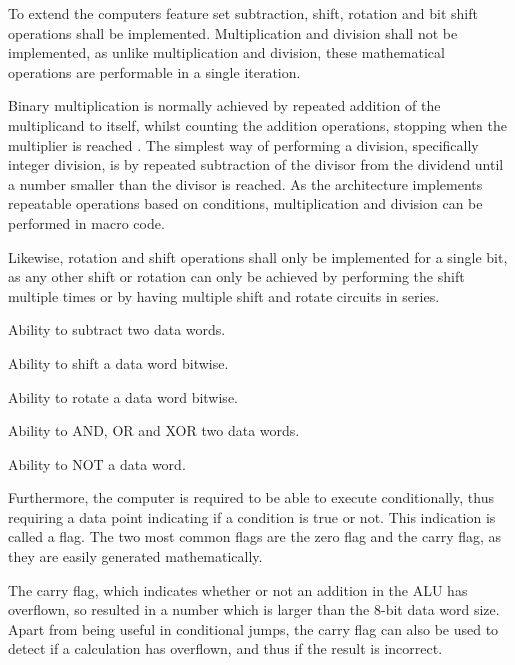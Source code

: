 To extend the computers feature set subtraction, shift, rotation and bit shift operations shall be implemented. Multiplication and division shall not be implemented, as unlike multiplication and division, these mathematical operations are performable in a single iteration. 

Binary multiplication is normally achieved by repeated addition of the multiplicand to itself, whilst counting the addition operations, stopping when the multiplier is reached \cite{cit.needed}. The simplest way of performing a division, specifically integer division, is by repeated subtraction of the divisor from the dividend until a number smaller than the divisor is reached.
As the architecture implements repeatable operations based on conditions, multiplication and division can be performed in macro code. 

Likewise, rotation and shift operations shall only be implemented for a single bit, as any other shift or rotation can only be achieved by performing the shift multiple times or by having multiple shift and rotate circuits in series. 

\begin{feat-requirement}
  Ability to subtract two data words.
\end{feat-requirement}

\begin{feat-requirement}
  Ability to shift a data word bitwise.
\end{feat-requirement}

\begin{feat-requirement}
  Ability to rotate a data word bitwise.
\end{feat-requirement}

\begin{feat-requirement}
  Ability to AND, OR and XOR two data words.
\end{feat-requirement}

\begin{feat-requirement}
  Ability to NOT a data word.
\end{feat-requirement}

Furthermore, the computer is required to be able to execute conditionally, thus requiring a data point indicating if a condition is true or not. This indication is called a flag. The two most common flags are the zero flag and the carry flag, as they are easily generated mathematically. 

The carry flag, which indicates whether or not an addition in the ALU has overflown, so resulted in a number which is larger than the 8-bit data word size. Apart from being useful in conditional jumps, the carry flag can also be used to detect if a calculation has overflown, and thus if the result is incorrect.

